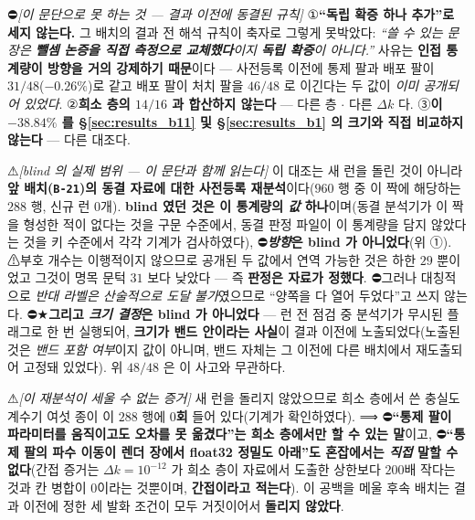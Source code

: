 \documentclass[11pt]{report}
\numberwithin{equation}{chapter}
\numberwithin{figure}{chapter}
\numberwithin{table}{chapter}
\begin{document}
⛔\emph{[이 문단으로 못 하는 것 --- 결과 이전에 동결된 규칙]}
①\textbf{``독립 확증 하나 추가''로 세지 않는다.} 그 배치의 결과 전 해석 규칙이
축자로 그렇게 못박았다: \emph{``쓸 수 있는 문장은 \textbf{뺄셈 논증을 직접 측정으로
교체했다}이지 \textbf{독립 확증}이 아니다.''} 사유는 \textbf{인접 통계량이 방향을 거의
강제하기 때문}이다 --- 사전등록 이전에 통제 팔과 배포 팔이 $31/48$($-0.26\%$)로 같고
배포 팔이 처치 팔을 $46/48$ 로 이긴다는 두 값이 \emph{이미 공개되어 있었다}.
②\textbf{희소 층의 $14/16$ 과 합산하지 않는다} --- 다른 층 $\cdot$ 다른 $\Delta k$ 다.
③\textbf{이 $-38.84\%$ 를 \S\ref{sec:results_b11} 및 \S\ref{sec:results_b1} 의 크기와
직접 비교하지 않는다} --- 다른 대조다.

⚠\emph{[blind 의 실제 범위 --- 이 문단과 함께 읽는다]} 이 대조는 새 런을 돌린 것이
아니라 \textbf{앞 배치(\texttt{B-21})의 동결 자료에 대한 사전등록 재분석}이다($960$ 행
중 이 짝에 해당하는 $288$ 행, 신규 런 $0$개). \textbf{blind 였던 것은 이 통계량의
\emph{값} 하나}이며(동결 분석기가 이 짝을 형성한 적이 없다는 것을 구문 수준에서, 동결
판정 파일이 이 통계량을 담지 않았다는 것을 키 수준에서 각각 기계가 검사하였다),
⛔\textbf{\emph{방향}은 blind 가 아니었다}(위 ①). ⚠부호 개수는 이행적이지 않으므로
공개된 두 값에서 연역 가능한 것은 하한 $29$ 뿐이었고 그것이 명목 문턱 $31$ 보다
낮았다 --- 즉 \textbf{판정은 자료가 정했다}. ⛔그러나 대칭적으로 \emph{반대 라벨은
산술적으로 도달 불가}였으므로 ``양쪽을 다 열어 두었다''고 쓰지 않는다.
⛔★\textbf{그리고 \emph{크기 결정}은 blind 가 아니었다} --- 런 전 점검 중 분석기가
무시된 플래그로 한 번 실행되어, \textbf{크기가 밴드 안이라는 사실}이 결과 이전에
노출되었다(노출된 것은 \emph{밴드 포함 여부}이지 값이 아니며, 밴드 자체는 그 이전에
다른 배치에서 재도출되어 고정돼 있었다). 위 $48/48$ 은 이 사고와 무관하다.

⚠\emph{[이 재분석이 세울 수 \emph{없는} 증거]} 새 런을 돌리지 않았으므로 희소 층에서
쓴 충실도 계수기 여섯 종이 이 $288$ 행에 \textbf{$0$회} 들어 있다(기계가 확인하였다).
⟹ ⛔\textbf{``통제 팔이 파라미터를 움직이고도 오차를 못 옮겼다''는 희소 층에서만 할 수
있는 말}이고, ⛔\textbf{``통제 팔의 파수 이동이 렌더 장에서 float32 정밀도 아래''도
혼잡에서는 \emph{직접} 말할 수 없다}(간접 증거는 $\Delta k = 10^{-12}$ 가 희소 층이
자료에서 도출한 상한보다 $200$배 작다는 것과 칸 병합이 $0$이라는 것뿐이며,
\textbf{간접이라고 적는다}). 이 공백을 메울 후속 배치는 결과 이전에 정한 세 발화
조건이 모두 거짓이어서 \textbf{돌리지 않았다}.

\end{document}
